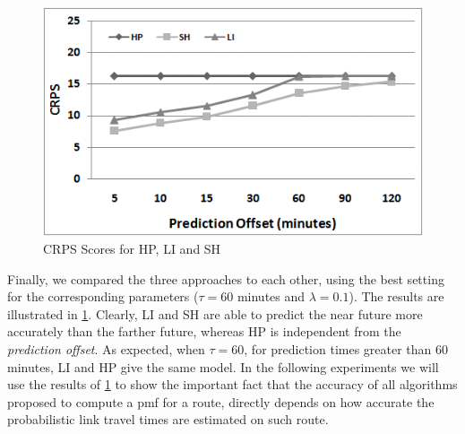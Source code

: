\begin{figure}[h]
	\centering
	\includegraphics[width = 0.6\columnwidth]{figures/Links_Best.png}
	\caption{CRPS Scores for HP, LI and SH}\label{fig:all_results}
\end{figure}

Finally, we compared the three approaches to each other, using the best setting for the corresponding parameters ($\tau = 60$ minutes and $\lambda = 0.1$). The results are illustrated in \cref{fig:all_results}. Clearly, LI and SH are able to predict the near future more accurately than the farther future, whereas HP is independent from the \textit{prediction offset}. As expected, when $\tau = 60$, for prediction times greater than 60 minutes, LI and HP give the same model. In the following experiments we will use the results of \cref{fig:all_results} to show the important fact that the accuracy of all algorithms proposed to compute a pmf for a route, directly depends on how accurate the probabilistic link travel times are estimated on such route.

